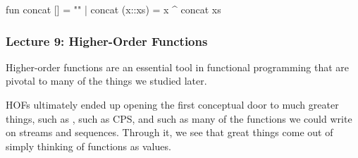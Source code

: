 \documentclass[aspectratio=169, handout]{beamer}
\begin{document}
{\begin{frame}[fragile]
\begin{codeblock}
    fun concat [] = ""
      | concat (x::xs) = x ^ concat xs
  \end{codeblock}
\end{frame}

\begin{frame}[fragile]
  \frametitle{Lecture 9: Higher-Order Functions}

  Higher-order functions are an essential tool in functional programming that
  are pivotal to many of the things we studied later.

  \pause
  \vspace{\fill}

  HOFs ultimately ended up opening the first conceptual door to much greater
  things, such as , such as CPS, and such as many of the functions
  we could write on streams and sequences. Through it, we see that great things
  come out of simply thinking of functions as values.

  \pause
  \vspace{\fill}


\end{frame}

}
\end{document}
